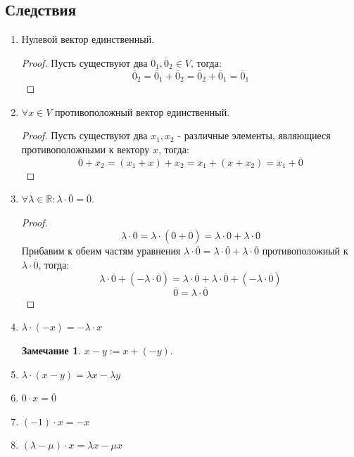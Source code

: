 \documentclass[a4paper, 12pt]{article}
\newcommand{\R}{\mathbb R}
\theoremstyle{definition}
\newtheorem*{remark}{Замечание}
\begin{document}
  \subsection{Следствия}
  \begin{enumerate}
    \item Нулевой вектор единственный.
    \begin{proof}
      Пусть существуют два $\overline{0}_1,\overline{0}_2 \in V$, тогда: $$\overline{0}_2 = \overline{0}_1 + \overline{0}_2 = \overline{0}_2 + \overline{0}_1 = \overline{0}_1$$   
    \end{proof} 
    \item $\forall x \in V$ противоположный вектор единственный.
    \begin{proof}
      Пусть существуют два $x_1,x_2$ - различные элементы,  являющиеся противоположными к вектору $x$, тогда:
      $$\overline{0} + x_2 = (x_1 + x) + x_2 = x_1 + (x + x_2) = x_1 + \overline{0}$$    
    \end{proof} 
    \item $\forall \lambda \in \R: \lambda \cdot \overline{0} = \overline{0}$.
      \begin{proof}
      $$\lambda \cdot \overline{0} = \lambda \cdot (\overline{0}+\overline{0}) = \lambda \cdot \overline{0} + \lambda \cdot \overline{0}$$ Прибавим к обеим частям уравнения $\lambda \cdot \overline{0} = \lambda \cdot \overline{0} + \lambda \cdot \overline{0}$  противоположный к $\lambda \cdot \overline{0}$, тогда: $$\lambda \cdot \overline{0} + (-\lambda \cdot \overline{0})= \lambda \cdot \overline{0} + \lambda \cdot \overline{0} + (-\lambda \cdot \overline{0})$$ $$\overline{0} = \lambda \cdot \overline{0}$$ 
      \end{proof} 
    \item $\lambda \cdot (-x) = -\lambda \cdot x$
    \begin{remark}
      $x - y := x + (-y)$.
    \end{remark}
    \item $\lambda \cdot (x-y) = \lambda x - \lambda y$ 
    \item $0 \cdot x = \overline{0}$
    \item $(-1) \cdot x = -x$
    \item $(\lambda - \mu)\cdot x = \lambda x - \mu x$  
  \end{enumerate}
\end{document}
